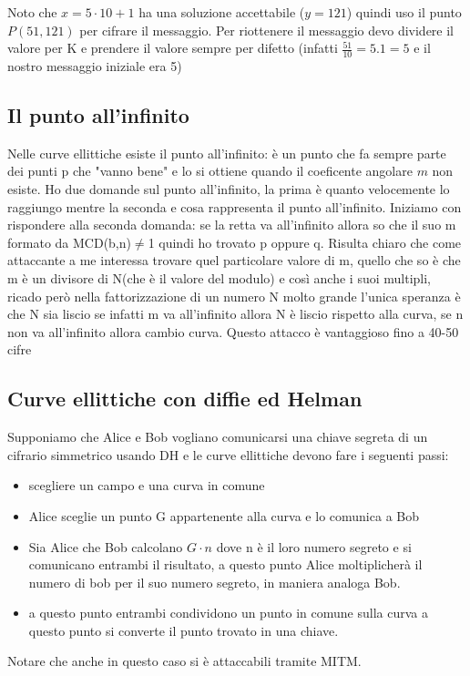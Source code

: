 \documentclass[10pt,a4paper]{article}
\begin{document}
Noto che $x=5\cdot10+1$ ha una soluzione accettabile ($y=121$) quindi uso il punto $P(51,121)$ per cifrare il messaggio. Per riottenere il messaggio devo dividere il valore per K e prendere il valore sempre per difetto (infatti $\frac{51}{10} = 5.1 = 5$ e il nostro messaggio iniziale era 5)
\subsection{Il punto all'infinito}
Nelle curve ellittiche esiste il punto all'infinito: è un punto che fa sempre parte dei punti p che "vanno bene" e lo si ottiene quando il coeficente angolare $m$ non esiste. Ho due domande sul punto all'infinito, la prima è quanto velocemente lo raggiungo mentre la seconda e cosa rappresenta il punto all'infinito. Iniziamo con rispondere alla seconda domanda: se la retta va all'infinito allora so che il suo m formato da MCD(b,n)$\not=$1 quindi ho trovato p oppure q. Risulta chiaro che come attaccante a me interessa trovare quel particolare valore di m, quello che so è che m è un divisore di N(che è il valore del modulo) e così anche i suoi multipli, ricado però nella fattorizzazione di un numero N molto grande l'unica speranza è che N sia liscio se infatti m va all'infinito allora N è liscio rispetto alla curva, se n non va all'infinito allora cambio curva. Questo attacco è vantaggioso fino a 40-50 cifre
\subsection{Curve ellittiche con diffie ed Helman}
Supponiamo che Alice e Bob vogliano comunicarsi una chiave segreta di un cifrario simmetrico usando DH e le curve ellittiche devono fare i seguenti passi:\\
\begin{itemize}
\item scegliere un campo e una curva in comune
\item Alice sceglie un punto G appartenente alla curva e lo comunica a Bob
\item Sia Alice che Bob calcolano $G\cdot n$ dove n è il loro numero segreto e si comunicano entrambi il risultato, a questo punto Alice moltiplicherà il numero di bob per il suo numero segreto, in maniera analoga Bob.
\item a questo punto entrambi condividono un punto in comune sulla curva a questo punto si converte il punto trovato in una chiave.
\end{itemize} 
Notare che anche in questo caso si è attaccabili tramite MITM.
\end{document}
